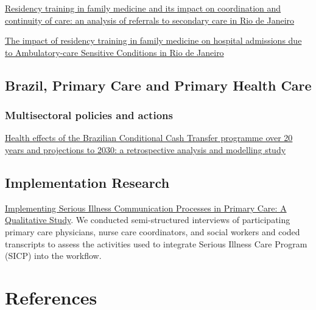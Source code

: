 \documentclass[
  letterpaper,
  DIV=11,
  numbers=noendperiod]{scrreprt}
\newlength{\cslhangindent}
\newenvironment{CSLReferences}[2] %
 {\begin{list}{}{%
  \setlength{\itemindent}{0pt}
  \setlength{\leftmargin}{0pt}
  \setlength{\parsep}{0pt}
  \ifodd #1
   \setlength{\leftmargin}{\cslhangindent}
   \setlength{\itemindent}{-1\cslhangindent}
  \fi
  \setlength{\itemsep}{#2\baselineskip}}}
 {\end{list}}
\begin{document}
\href{https://pmc.ncbi.nlm.nih.gov/articles/PMC8852675/pdf/bmjopen-2021-051515.pdf}{Residency
training in family medicine and its impact on coordination and
continuity of care: an analysis of referrals to secondary care in Rio de
Janeiro}

\href{https://journals.plos.org/globalpublichealth/article?id=10.1371/journal.pgph.0000547}{The
impact of residency training in family medicine on hospital admissions
due to Ambulatory-care Sensitive Conditions in Rio de Janeiro}

\section{Brazil, Primary Care and Primary Health
Care}\label{brazil-primary-care-and-primary-health-care}

\subsection{Multisectoral policies and
actions}\label{multisectoral-policies-and-actions}

\href{https://www.thelancet.com/journals/lanpub/article/PIIS2468-2667\%2825\%2900091-X/fulltext}{Health
effects of the Brazilian Conditional Cash Transfer programme over 20
years and projections to 2030: a retrospective analysis and modelling
study}

\section{Implementation Research}\label{implementation-research}

\href{https://pubmed.ncbi.nlm.nih.gov/32794412/}{Implementing Serious
Illness Communication Processes in Primary Care: A Qualitative Study}.
We conducted semi-structured interviews of participating primary care
physicians, nurse care coordinators, and social workers and coded
transcripts to assess the activities used to integrate Serious Illness
Care Program (SICP) into the workflow.


\chapter*{References}\label{references}


\label{refs}
\begin{CSLReferences}{0}{1}
\end{CSLReferences}
\end{document}
